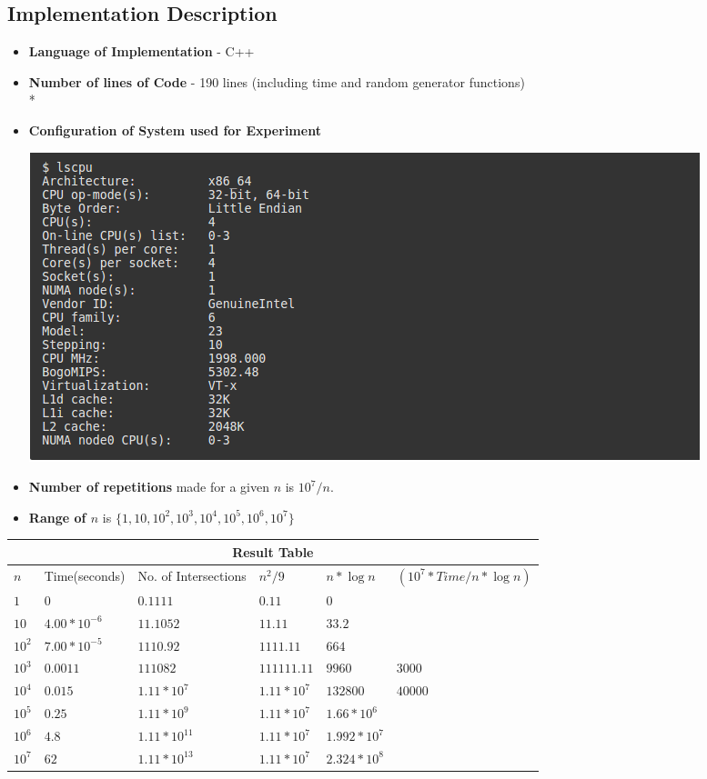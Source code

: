 \documentclass{article}
\begin{document}
\subsection{Implementation Description}
\begin{itemize}
\item {\bf Language of Implementation} - C++ 
\item {\bf Number of lines of Code} - 190 lines (including time and random generator functions)\\*
\item {\bf Configuration of System used for Experiment}
\begin{center}
\includegraphics[scale=0.5]{system_conf.png}
\end{center}
\item {\bf Number of repetitions} made for a given {\bf $n$} is {\bf $10^7/n$}. 
\item {\bf Range of $n$ } is {\bf $\{1,10,10^2, 10^3, 10^4, 10^5, 10^6, 10^7 \} $}
\end{itemize}
\hspace*{-2.5cm}\begin{tabular}{|p{1cm}|p{2.5cm}|p{2.5cm}|p{2cm}|p{2cm}|p{4cm}|}
 \hline
 \multicolumn{6}{|c|}{Result Table} \\
 \hline
 $n$   & Time(seconds) & No. of Intersections & $n^2/9$ &  $n *\log n $ & $(10^7 * Time/n* \log n)$\\
 \hline 
 $1$   	& $0$ 		& $0.1111$	& $ 0.11 $ 		& $ 0 $  		& $ $	\\
 \hline
 $10$  	& $4.00 * 10^{-6}$	& $11.1052$ & $ 11.11 $		& $ 33.2 $		& $ $	\\
 \hline
 $10^2$	& $7.00 * 10^{-5}$	& $1110.92$	& $ 1111.11$		& $ 664 $		& $ $	\\
 \hline
 $10^3$	& $0.0011$	& $111082$	& $ 111111.11 $ 	& $	9960	 $		& $ 3000 $	\\
 \hline
 $10^4$	& $0.015$  	& $1.11* 10^7 $	& $ 1.11 * 10^7  $	& $	132800 $		& $ 40000 $\\
 \hline
 $10^5$	& $0.25$ 	& $1.11* 10^9$& $ 1.11 * 10^7	$ 	& $	1.66 * 10^6$	&	\\
 \hline
 $10^6$	& $4.8$		& $1.11* 10^{11}$& $ 1.11 * 10^7 $	& $	1.992 * 10^7$	&	\\
 \hline
 $10^7$	& $62$		& $1.11* 10^{13}$& $ 1.11 * 10^7 $	& $	2.324 * 10^8$	&	\\
 \hline
\end{tabular}
\end{document}
